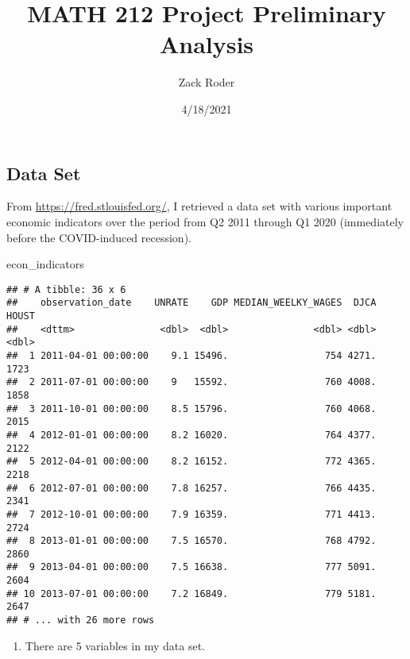 \documentclass[
]{article}
\title{MATH 212 Project Preliminary Analysis}
\author{Zack Roder}
\date{4/18/2021}
\newenvironment{Shaded}{\begin{snugshade}}{\end{snugshade}}
\newcommand{\NormalTok}[1]{#1}
\providecommand{\tightlist}{%
  \setlength{\itemsep}{0pt}\setlength{\parskip}{0pt}}
\begin{document}
\maketitle

\hypertarget{data-set}{%
\subsection{Data Set}\label{data-set}}

From \url{https://fred.stlouisfed.org/}, I retrieved a data set with
various important economic indicators over the period from Q2 2011
through Q1 2020 (immediately before the COVID-induced recession).

\begin{Shaded}
\begin{Highlighting}[]
\NormalTok{econ\_indicators}
\end{Highlighting}
\end{Shaded}

\begin{verbatim}
## # A tibble: 36 x 6
##    observation_date    UNRATE    GDP MEDIAN_WEELKY_WAGES  DJCA HOUST
##    <dttm>               <dbl>  <dbl>               <dbl> <dbl> <dbl>
##  1 2011-04-01 00:00:00    9.1 15496.                 754 4271.  1723
##  2 2011-07-01 00:00:00    9   15592.                 760 4008.  1858
##  3 2011-10-01 00:00:00    8.5 15796.                 760 4068.  2015
##  4 2012-01-01 00:00:00    8.2 16020.                 764 4377.  2122
##  5 2012-04-01 00:00:00    8.2 16152.                 772 4365.  2218
##  6 2012-07-01 00:00:00    7.8 16257.                 766 4435.  2341
##  7 2012-10-01 00:00:00    7.9 16359.                 771 4413.  2724
##  8 2013-01-01 00:00:00    7.5 16570.                 768 4792.  2860
##  9 2013-04-01 00:00:00    7.5 16638.                 777 5091.  2604
## 10 2013-07-01 00:00:00    7.2 16849.                 779 5181.  2647
## # ... with 26 more rows
\end{verbatim}

\begin{enumerate}
\def\labelenumi{\arabic{enumi}.}
\tightlist
\item
  There are 5 variables in my data set.
\end{enumerate}
\end{document}
